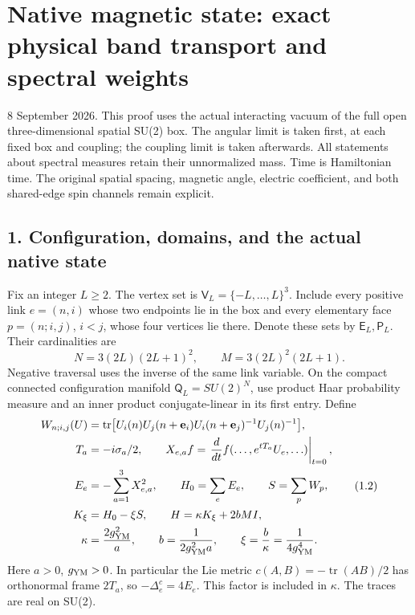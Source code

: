 \documentclass[
  11pt,
]{article}
\begin{document}
\clearpage
\section{Native magnetic state: exact physical band transport and
spectral
weights}\label{magnetic-part-9-native-magnetic-state-exact-physical-band-transport-and-spectral-weights}

8 September 2026. This proof uses the actual interacting vacuum of the
full open three-dimensional spatial SU(2) box. The angular limit is
taken first, at each fixed box and coupling; the coupling limit is taken
afterwards. All statements about spectral measures retain their
unnormalized mass. Time is Hamiltonian time. The original spatial
spacing, magnetic angle, electric coefficient, and both shared-edge spin
channels remain explicit.

\subsection{1. Configuration, domains, and the actual native
state}\label{magnetic-part-9-configuration-domains-and-the-actual-native-state}

Fix an integer \(L\geq2\). The vertex set is
\(\mathsf V_L=\{-L,\ldots,L\}^3\). Include every positive link
\(e=(n,i)\) whose two endpoints lie in the box and every elementary face
\(p=(n;i,j)\), \(i<j\), whose four vertices lie there. Denote these sets
by \(\mathsf E_L,\mathsf P_L\). Their cardinalities are \[
 N=3(2L)(2L+1)^2,\qquad M=3(2L)^2(2L+1).
\tag{1.1}
\] Negative traversal uses the inverse of the same link variable. On the
compact connected configuration manifold \(\mathsf Q_L=SU(2)^N\), use
product Haar probability measure and an inner product conjugate-linear
in its first entry. Define \[
\begin{split}
 W_{n;i,j}(U)&=\operatorname{tr}\bigl[
 U_i(n)U_j(n+\mathbf e_i)U_i(n+\mathbf e_j)^{-1}U_j(n)^{-1}\bigr],\\
 T_a&=-i\sigma_a/2,\qquad
 X_{e,a}f=\left.\frac{d}{dt}f(\ldots,e^{tT_a}U_e,\ldots)\right|_{t=0},\\
 E_e&=-\sum_{a=1}^3X_{e,a}^2,\qquad H_0=\sum_eE_e,\qquad S=\sum_pW_p,\\
 K_\xi&=H_0-\xi S,\qquad H=\kappa K_\xi+2bM I,\\
 \kappa&=\frac{2g_{\rm YM}^2}{a},\qquad
 b=\frac1{2g_{\rm YM}^2a},\qquad
 \xi=\frac b\kappa=\frac1{4g_{\rm YM}^4}.
\end{split}
\tag{1.2}
\] Here \(a>0\), \(g_{\rm YM}>0\). In particular the Lie metric
\(c(A,B)=-\operatorname{tr}(AB)/2\) has orthonormal frame \(2T_a\), so
\(-\Delta_e^c=4E_e\). This factor is included in \(\kappa\). The traces
are real on SU(2).
\end{document}
